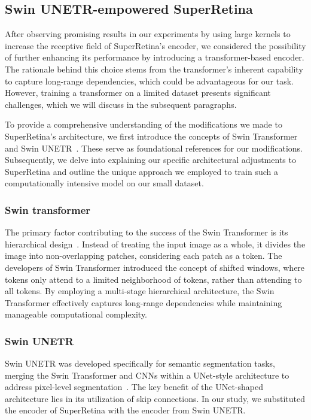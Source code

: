 \documentclass[10pt,twocolumn,letterpaper]{article}
\begin{document}
\subsection{Swin UNETR-empowered SuperRetina}
After observing promising results in our experiments by using large kernels to increase the receptive field of SuperRetina's encoder, we considered the possibility of further enhancing its performance by introducing a transformer-based encoder. The rationale behind this choice stems from the transformer's inherent capability to capture long-range dependencies, which could be advantageous for our task. However, training a transformer on a limited dataset presents significant challenges, which we will discuss in the subsequent paragraphs. 

To provide a comprehensive understanding of the modifications we made to SuperRetina's architecture, we first introduce the concepts of Swin Transformer~\cite{liu2021swin} and Swin UNETR~\cite{hatamizadeh2021swin}. These serve as foundational references for our modifications. Subsequently, we delve into explaining our specific architectural adjustments to SuperRetina and outline the unique approach we employed to train such a computationally intensive model on our small dataset.

\subsubsection{Swin transformer}
The primary factor contributing to the success of the Swin Transformer is its hierarchical design~\cite{liu2021swin}. Instead of treating the input image as a whole, it divides the image into non-overlapping patches, considering each patch as a token. The developers of Swin Transformer introduced the concept of shifted windows, where tokens only attend to a limited neighborhood of tokens, rather than attending to all tokens. By employing a multi-stage hierarchical architecture, the Swin Transformer effectively captures long-range dependencies while maintaining manageable computational complexity.

\subsubsection{Swin UNETR}
Swin UNETR was developed specifically for semantic segmentation tasks, merging the Swin Transformer and CNNs within a UNet-style architecture to address pixel-level segmentation~\cite{hatamizadeh2021swin}. The key benefit of the UNet-shaped architecture lies in its utilization of skip connections. In our study, we substituted the encoder of SuperRetina with the encoder from Swin UNETR.
\end{document}
